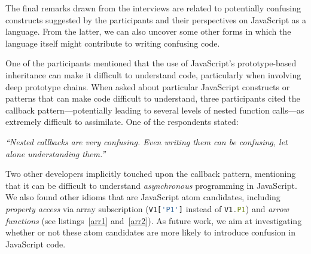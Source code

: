 The final remarks drawn from the interviews are related to potentially confusing constructs suggested by the participants and their perspectives on JavaScript as a language. From the latter, we can also uncover some other forms in which the language itself might contribute to writing confusing code.

One of the participants mentioned that the use of JavaScript's prototype-based inheritance can make it difficult to understand code, particularly when involving deep prototype chains.
When asked about particular JavaScript constructs or patterns that can make code difficult to understand, three participants cited the callback pattern---potentially leading to several levels of nested function calls---as extremely difficult to assimilate. One of the respondents stated:

\begin{mq}
\emph{``Nested callbacks are very confusing. Even writing them can be confusing, let alone understanding them.''}
\end{mq}

Two other developers implicitly touched upon the callback pattern, mentioning that it can be difficult to understand \emph{asynchronous} programming in JavaScript.
We also found other idioms that are JavaScript atom candidates, including
\emph{property access} via array subscription (\lstinline[language=javascript]{V1['P1']} instead of \lstinline[language=javascript]{V1.P1}) and \emph{arrow functions} (see listings~\ref{arr1} and~\ref{arr2}).  As future work, we aim at investigating whether or not these atom candidates are more likely to introduce confusion in JavaScript code.

